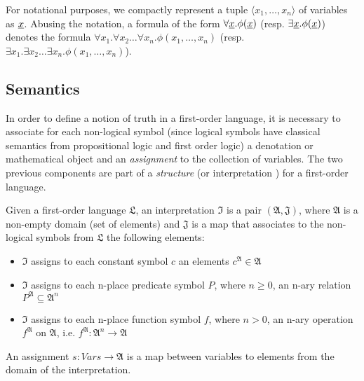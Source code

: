 \begin{definition}
For notational purposes, we compactly represent a 
tuple $\langle x_1, \dots, x_n \rangle$ of variables as
$\underline{x}$. Abusing the notation, a formula of the form 
$\forall \underline{x} . \phi(\underline{x})$ (resp. $\exists \underline{x} . 
\phi(\underline{x})$)
denotes the formula $\forall x_1 . \forall x_2 \dots 
\forall x_n . \phi(x_1, \dots, x_n)$
(resp. $\exists x_1 . \exists x_2 \dots \exists x_n . \phi(x_1, \dots, x_n)$).

\end{definition}

\subsection{Semantics}

In order to define a notion of truth in a 
first-order language, it is necessary to 
associate for each non-logical symbol (since logical symbols have 
classical semantics from propositional logic and first order
logic) a 
denotation or mathematical object and 
an \emph{assignment} to the collection of variables. The two previous 
components are part of a \emph{structure} \cite{DBLP:books/daglib/0076838} 
(or interpretation \cite{DBLP:books/daglib/0080654}) for a first-order language.

\begin{definition}
  Given a first-order language $\mathfrak{L}$, an interpretation $\mathfrak{I}$ is a pair $(\mathfrak{A}, \mathfrak{J})$, where $\mathfrak{A}$ is a non-empty domain (set of elements) and $\mathfrak{J}$ is a map that associates to the non-logical symbols from $\mathfrak{L}$ the following elements:
  \begin{itemize}
    \item $\mathfrak{I}$ assigns to each constant symbol $c$
      an elements $c^\mathfrak{A} \in \mathfrak{A}$
    \item $\mathfrak{I}$ assigns to each n-place
      predicate symbol $P$, where $n \geq 0$, an n-ary relation 
      $P^{\mathfrak{A}} \subseteq \mathfrak{A}^n$
    \item $\mathfrak{I}$ assigns to each n-place function
      symbol $f$, where $n > 0$, 
      an n-ary operation $f^\mathfrak{A}$
      on $\mathfrak{A}$, i.e. $f^\mathfrak{A} : 
      \mathfrak{A}^n \rightarrow \mathfrak{A}$
  \end{itemize}

  An assignment $s : Vars \rightarrow \mathfrak{A}$ is a 
  map between variables to elements from the domain of 
  the interpretation.
\end{definition}

